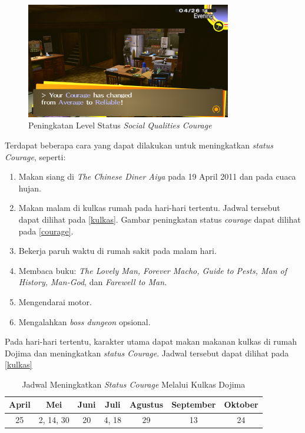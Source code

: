 \begin{figure}[htbp]
    \centering
    \includegraphics[width=0.8\textwidth]{resources/Dokumentasi/Screenshot (381).png}
    \caption{\label{courage}Peningkatan Level Status \textit{Social Qualities Courage}}
\end{figure}

Terdapat beberapa cara yang dapat dilakukan untuk meningkatkan \textit{status Courage}, seperti:
\begin{enumerate}
    \item Makan siang di \textit{The Chinese Diner Aiya} pada 19 April 2011 dan pada cuaca hujan.
    \item Makan malam di kulkas rumah pada hari-hari tertentu. Jadwal tersebut dapat dilihat pada \autoref{kulkas}. Gambar peningkatan status \textit{courage} dapat dilihat pada \autoref{courage}.
    \item Bekerja paruh waktu di rumah sakit pada malam hari.
    \item Membaca buku: \textit{The Lovely Man, Forever Macho, Guide to Pests, Man of History, Man-God}, dan \textit{Farewell to Man.}
    \item Mengendarai motor.
    \item Mengalahkan \textit{boss dungeon} opsional.
\end{enumerate}

Pada hari-hari tertentu, karakter utama dapat makan makanan kulkas di rumah Dojima dan meningkatkan \textit{status Courage}. Jadwal tersebut dapat dilihat pada \autoref{kulkas}
\begin{table}[htb]
    \caption{\label{kulkas}Jadwal Meningkatkan \textit{Status Courage} Melalui Kulkas Dojima}
    \begin{center}
        \begin{tabular}{ | c | c | c | c | c | c | c | }
            \hline
            \textbf{April} & \textbf{Mei} & \textbf{Juni} & \textbf{Juli} & \textbf{Agustus} & \textbf{September} & \textbf{Oktober} \\
            \hline
            25             & 2, 14, 30    & 20            & 4, 18         & 29               & 13                 & 24               \\
            \hline
        \end{tabular}
    \end{center}
\end{table}

